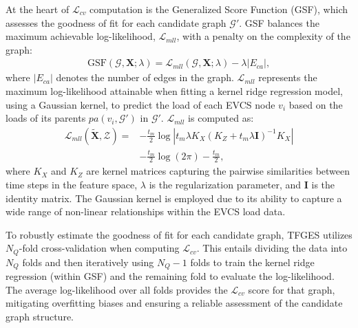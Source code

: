 \documentclass[lettersize,journal]{IEEEtran}
\begin{document}
At the heart of $\mathcal{L}_{cv}$ computation is the Generalized Score Function (GSF), which assesses the goodness of fit for each candidate graph $\mathcal{G}'$. GSF balances the maximum achievable log-likelihood, $\mathcal{L}_{mll}$, with a penalty on the complexity of the graph:
\begin{equation}
\begin{aligned}
\text{GSF}(\mathcal{G}, \bm{X}; \lambda) = \mathcal{L}_{mll}(\mathcal{G}, \bm{X}; \lambda) - \lambda |E_{ca}|,
\end{aligned}
\label{eq:gsf}
\end{equation}
where $|E_{ca}|$ denotes the number of edges in the graph. $\mathcal{L}_{mll}$ represents the maximum log-likelihood attainable when fitting a kernel ridge regression model, using a Gaussian kernel, to predict the load of each EVCS node $v_i$ based on the loads of its parents $pa(v_i, \mathcal{G}')$ in $\mathcal{G}'$. $\mathcal{L}_{mll}$ is computed as:
\begin{equation}
\begin{aligned}
\mathcal{L}_{m l l}(\tilde{\boldsymbol{X}}, \mathcal{Z})= & -\frac{t_m}{2} \log \left|t_m \lambda K_X\left(K_Z+t_m \lambda \bm{I}\right)^{-1} K_X\right| \\
& -\frac{t_m}{2} \log (2 \pi)-\frac{t_m}{2},
\end{aligned}
\label{eq:mll}
\end{equation}
where $K_X$ and $K_Z$ are kernel matrices capturing the pairwise similarities between time steps in the feature space, $\lambda$ is the regularization parameter, and $\bm{I}$ is the identity matrix. The Gaussian kernel is employed due to its ability to capture a wide range of non-linear relationships within the EVCS load data.

To robustly estimate the goodness of fit for each candidate graph, TFGES utilizes $N_Q$-fold cross-validation when computing $\mathcal{L}_{cv}$. This entails dividing the data into $N_Q$ folds and then iteratively using $N_Q-1$ folds to train the kernel ridge regression (within GSF) and the remaining fold to evaluate the log-likelihood. The average log-likelihood over all folds provides the $\mathcal{L}_{cv}$ score for that graph, mitigating overfitting biases and ensuring a reliable assessment of the candidate graph structure.
\end{document}

